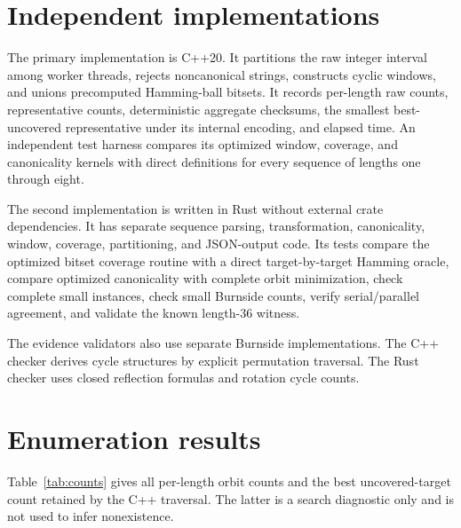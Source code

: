 \documentclass[11pt]{article}
\begin{document}
\section{Independent implementations}

The primary implementation is C++20. It partitions the raw integer interval
among worker threads, rejects noncanonical strings, constructs cyclic windows,
and unions precomputed Hamming-ball bitsets. It records per-length raw counts,
representative counts, deterministic aggregate checksums, the smallest
best-uncovered representative under its internal encoding, and elapsed time.
An independent test harness compares its optimized window, coverage, and
canonicality kernels with direct definitions for every sequence of lengths
one through eight.

The second implementation is written in Rust without external crate
dependencies. It has separate sequence parsing, transformation, canonicality,
window, coverage, partitioning, and JSON-output code. Its tests compare the
optimized bitset coverage routine with a direct target-by-target Hamming
oracle, compare optimized canonicality with complete orbit minimization,
check complete small instances, check small Burnside counts, verify
serial/parallel agreement, and validate the known length-36 witness.

The evidence validators also use separate Burnside implementations. The C++
checker derives cycle structures by explicit permutation traversal. The Rust
checker uses closed reflection formulas and rotation cycle counts.

\section{Enumeration results}

Table~\ref{tab:counts} gives all per-length orbit counts and the best
uncovered-target count retained by the C++ traversal. The latter is a search
diagnostic only and is not used to infer nonexistence.
\end{document}
